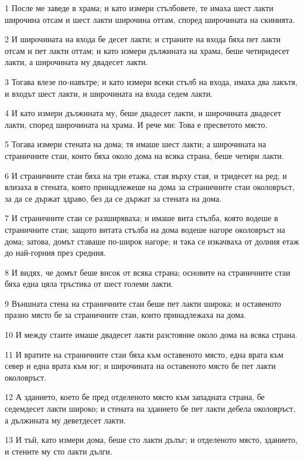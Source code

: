 \par 1 После ме заведе в храма; и като измери стълбовете, те имаха шест лакти широчина отсам и шест лакти широчина оттам, според широчината на скинията.
\par 2 И широчината на входа бе десет лакти; и страните на входа бяха пет лакти отсам и пет лакти оттам; и като измери дължината на храма, беше четиридесет лакти, а широчината му двадесет лакти.
\par 3 Тогава влезе по-навътре; и като измери всеки стълб на входа, имаха два лакътя, и входът шест лакти, и широчината на входа седем лакти.
\par 4 И като измери дължината му, беше двадесет лакти, и широчината двадесет лакти, според широчината на храма. И рече ми: Това е пресветото място.
\par 5 Тогава измери стената на дома; тя имаше шест лакти; а широчината на страничните стаи, които бяха около дома на всяка страна, беше четири лакти.
\par 6 И страничните стаи бяха на три етажа, стая върху стая, и тридесет на ред; и влизаха в стената, която принадлежеше на дома за страничните стаи околовръст, за да се държат здраво, без да се държат за стената на дома.
\par 7 И страничните стаи се разширяваха; и имаше вита стълба, която водеше в страничните стаи; защото витата стълба на дома водеше нагоре околовръст на дома; затова, домът ставаше по-широк нагоре; и така се изкачваха от долния етаж до най-горния през средния.
\par 8 И видях, че домът беше висок от всяка страна; основите на страничните стаи бяха една цяла тръстика от шест големи лакти.
\par 9 Външната стена на страничните стаи беше пет лакти широка; и оставеното празно място бе за страничните стаи, които принадлежаха на дома.
\par 10 И между стаите имаше двадесет лакти разстояние около дома на всяка страна.
\par 11 И вратите на страничните стаи бяха към оставеното място, една врата към север и една врата към юг; и широчината на оставеното място бе пет лакти околовръст.
\par 12 А зданието, което бе пред отделеното място към западната страна, бе седемдесет лакти широко; и стената на зданието бе пет лакти дебела околовръст, а дължината му деветдесет лакти.
\par 13 И тъй, като измери дома, беше сто лакти дълъг; и отделеното място, зданието, и стените му сто лакти дълги.

